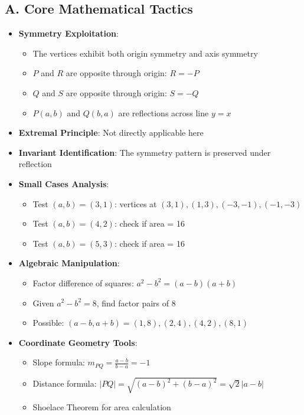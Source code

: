 \documentclass[]{article}
\begin{document}
\begin{tacticalbox}
\subsection*{A. Core Mathematical Tactics}
\begin{itemize}[leftmargin=*]
    \item \textbf{Symmetry Exploitation}: 
    \begin{itemize}
        \item The vertices exhibit both origin symmetry and axis symmetry
        \item $P$ and $R$ are opposite through origin: $R = -P$
        \item $Q$ and $S$ are opposite through origin: $S = -Q$
        \item $P(a,b)$ and $Q(b,a)$ are reflections across line $y=x$
    \end{itemize}
    
    \item \textbf{Extremal Principle}: Not directly applicable here
    
    \item \textbf{Invariant Identification}: The symmetry pattern is preserved under reflection
    
    \item \textbf{Small Cases Analysis}:
    \begin{itemize}
        \item Test $(a,b) = (3,1)$: vertices at $(3,1), (1,3), (-3,-1), (-1,-3)$
        \item Test $(a,b) = (4,2)$: check if area = 16
        \item Test $(a,b) = (5,3)$: check if area = 16
    \end{itemize}
    
    \item \textbf{Algebraic Manipulation}:
    \begin{itemize}
        \item Factor difference of squares: $a^2 - b^2 = (a-b)(a+b)$
        \item Given $a^2 - b^2 = 8$, find factor pairs of 8
        \item Possible: $(a-b, a+b) = (1,8), (2,4), (4,2), (8,1)$
    \end{itemize}
    
    \item \textbf{Coordinate Geometry Tools}:
    \begin{itemize}
        \item Slope formula: $m_{PQ} = \frac{a-b}{b-a} = -1$
        \item Distance formula: $|PQ| = \sqrt{(a-b)^2 + (b-a)^2} = \sqrt{2}|a-b|$
        \item Shoelace Theorem for area calculation
    \end{itemize}
\end{itemize}


\end{tacticalbox}
\end{document}
